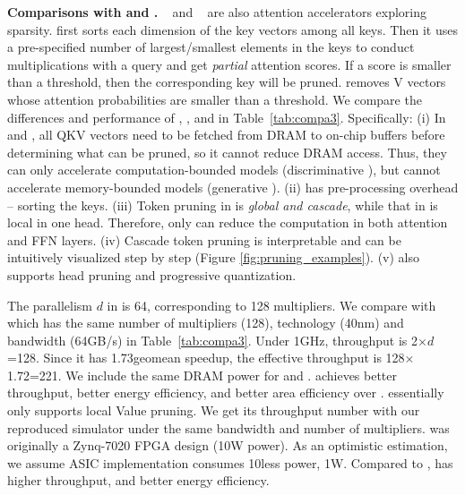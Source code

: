 

\textbf{Comparisons with \athree and \mnnfast.}
\athree~\cite{ham20203} and \mnnfast~\cite{8980322} are also attention accelerators exploring sparsity. \athree first sorts each dimension of the key vectors among all keys. Then it uses a pre-specified number of largest/smallest elements in the keys to conduct multiplications with a query and get \emph{partial} attention scores. If a score is smaller than a threshold, then the corresponding key will be pruned. \mnnfast removes V vectors whose attention probabilities are smaller than a threshold.
We compare the differences and performance of \spattensmall, \athree, and \mnnfast in Table~\ref{tab:compa3}. Specifically: (i) In \athree and \mnnfast, all QKV vectors need to be fetched from DRAM to on-chip buffers before determining what can be pruned, so it cannot reduce DRAM access. Thus, they can only accelerate computation-bounded models (discriminative \bert), but cannot accelerate memory-bounded models (generative \gpttwo). (ii) \athree has pre-processing overhead -- sorting the keys. (iii) Token pruning in \name is \emph{global and cascade}, while that in \athree is local in one head. Therefore, only \name can reduce the computation in both attention and FFN layers. (iv) Cascade token pruning is interpretable and can be intuitively visualized step by step (Figure \ref{fig:pruning_examples}). (v) \name also supports head pruning and progressive quantization.




The parallelism $d$ in {\athree} is 64, corresponding to 128 multipliers. We compare \athree with {\spattensmall} which has the same number of multipliers (128), technology (40nm) and bandwidth (64GB/s) in Table~\ref{tab:compa3}.
Under 1GHz, \athree throughput is 2$\times d$=128\gflopss. Since it has 1.73\x geomean speedup, the effective throughput is 128$\times$1.72=221\gflopss. We include the same DRAM power for \athree and \spattensmall. \spattensmall\xspace achieves \perfoverathree\x better throughput, \eeoverathree\x better energy efficiency, and \aeoverathree\x better area efficiency over \athree.
\mnnfast essentially only supports local Value pruning. We get its throughput number with our reproduced simulator under the same bandwidth and number of multipliers. \mnnfast was originally a Zynq-7020 FPGA design (10W power). As an optimistic estimation, we assume ASIC implementation consumes 10\x less power, \ie 1W. Compared to \mnnfast, \spattensmall\xspace has \perfovermnnfast\x higher throughput, and \eeovermnnfast\x better energy efficiency. 



